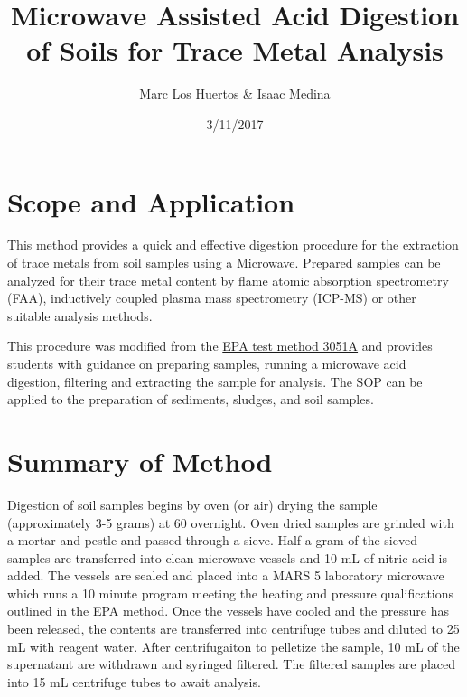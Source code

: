 \documentclass[12pt]{../SOP3_alpha}\usepackage[]{graphicx}\usepackage[]{color}
\title{Microwave Assisted Acid Digestion of Soils for Trace Metal Analysis}
\date{3/11/2017}
\author{Marc Los Huertos \& Isaac Medina}
\begin{document}
\maketitle

\section{Scope and Application}

\NP This method provides a quick and effective digestion procedure for the extraction of trace metals from soil samples using a Microwave. Prepared samples can be analyzed for their trace metal content by flame atomic absorption spectrometry (FAA), inductively coupled plasma mass spectrometry (ICP-MS) or other suitable analysis methods. 

\NP This procedure was modified from the \href{https://www.google.com/url?sa=t&rct=j&q=&esrc=s&source=web&cd=1&cad=rja&uact=8&ved=0ahUKEwjNmefY3tfWAhVP92MKHatgCaQQFggqMAA&url=https%3A%2F%2Fwww.epa.gov%2Fsites%2Fproduction%2Ffiles%2F2015-12%2Fdocuments%2F3051a.pdf&usg=AOvVaw1LPlngQyM_L4Zu4SC-sATE}{EPA test method 3051A} and provides students with guidance on preparing samples, running a microwave acid digestion, filtering and extracting the sample for analysis. 
\NP The SOP can be applied to the preparation of sediments, sludges, and soil samples.

\section{Summary of Method}
Digestion of soil samples begins by oven (or air) drying the sample (approximately 3-5 grams) at 60 \textcelsius{} overnight. Oven dried samples are grinded with a mortar and pestle and passed through a sieve. Half a gram of the sieved samples are transferred into clean microwave vessels and 10 mL of nitric acid is added. The vessels are sealed and placed into a MARS 5 laboratory microwave which runs a 10 minute program meeting the heating and pressure qualifications outlined in the EPA method. Once the vessels have cooled and the pressure has been released, the contents are transferred into centrifuge tubes and diluted to 25 mL with reagent water. After centrifugaiton to pelletize the sample, 10 mL of the supernatant are withdrawn and syringed filtered. The filtered samples are placed into 15 mL centrifuge tubes to await analysis. 

\tableofcontents

\newpage
\end{document}
